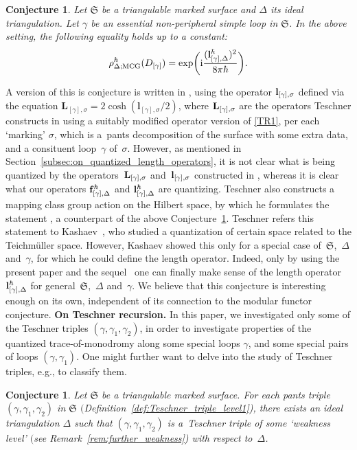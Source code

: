 \documentclass[10pt,a4paper]{amsart}
\numberwithin{equation}{section}
\newtheorem{Conjecture}[Theorem]{Conjecture}
\theoremstyle{definition}
\begin{document}
\begin{Conjecture}
\label{conjecture:Dehn}
Let $\mathfrak{S}$ be a triangulable marked surface and $\Delta$ its ideal triangulation. Let $\gamma$ be an essential non-peripheral simple loop in $\mathfrak{S}$. In the above setting, the following equality holds up to a constant:
\[
\rho^\hbar_{\Delta;{\rm MCG}} (D_{[\gamma]}) = \exp\biggl( {\rm i} \frac{ ({\bf l}^\hbar_{[\gamma],\Delta})^2 }{8\pi \hbar} \biggr).
\]
\end{Conjecture}
A version of this is conjecture is written in \cite[Proposition~12]{T}, using the operator ${\bf l}_{[\gamma],\sigma}$ defined via the equation $\mathbf{L}_{[\gamma],\sigma} = 2 \cosh(\mathbf{l}_{[\gamma],\sigma}/2)$, where ${\bf L}_{[\gamma],\sigma}$ are the operators Teschner constructs in \cite{T} using a suitably modified operator version of \ref{TR1}, per each `marking' $\sigma$, which is a~pants decomposition of the surface with some extra data, and a consituent loop~$\gamma$ of~$\sigma$. However, as mentioned in Section~\ref{subsec:on_quantized_length_operators}, it is not clear what is being quantized by the operators~${\bf L}_{[\gamma],\sigma}$ and~${\bf l}_{[\gamma],\sigma}$ constructed in \cite{T}, whereas it is clear what our operators ${\bf f}^\hbar_{[\gamma],\Delta}$ and ${\bf l}^\hbar_{[\gamma],\Delta}$ are quantizing.
Teschner also constructs a mapping class group action on the Hilbert space, by which he formulates the statement \cite[Proposition~12]{T}, a counterpart of the above Conjecture~\ref{conjecture:Dehn}.
Teschner refers this statement to Kashaev~\cite{Kash00}, who studied a quantization of certain space related to the Teichm\"uller space. However, Kashaev showed this only for a special case of~$\mathfrak{S}$,~$\Delta$ and~$\gamma$, for which he could define the length operator. Indeed, only by using the present paper and the sequel~\cite{sequel} one can finally make sense of the length operator ${\bf l}^\hbar_{[\gamma],\Delta}$ for general~$\mathfrak{S}$,~$\Delta$ and~$\gamma$. We believe that this conjecture is interesting enough on its own, independent of its connection to the modular functor conjecture.
{\bf On Teschner recursion.}
In this paper, we investigated only some of the Teschner triples $(\gamma,\gamma_1,\gamma_2)$, in order to investigate properties of the quantized trace-of-monodromy along some special loops $\gamma$, and some special pairs of loops $(\gamma,\gamma_1)$. One might further want to delve into the study of Teschner triples, e.g., to classify them.
\begin{Conjecture}
Let $\mathfrak{S}$ be a triangulable marked surface. For {\em each} pants triple $(\gamma,\gamma_1,\gamma_2)$ in $\mathfrak{S}$ $($Definition~{\rm \ref{def:Teschner_triple_level1})}, there exists an ideal triangulation $\Delta$ such that $(\gamma,\gamma_1,\gamma_2)$ is a~Teschner triple of some `weakness level' $($see Remark~{\rm \ref{rem:further_weakness})} with respect to~$\Delta$.
\end{Conjecture}
\end{document}

